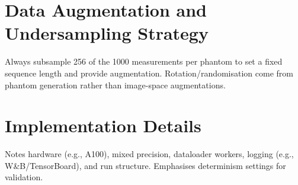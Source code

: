 
\section{Data Augmentation and Undersampling Strategy}

Always subsample 256 of the 1000 measurements per phantom to set a fixed sequence length and provide augmentation. Rotation/randomisation come from phantom generation rather than image-space augmentations.


\section{Implementation Details}

Notes hardware (e.g., A100), mixed precision, dataloader workers, logging (e.g., W\&B/TensorBoard), and run structure. Emphasises determinism settings for validation.



